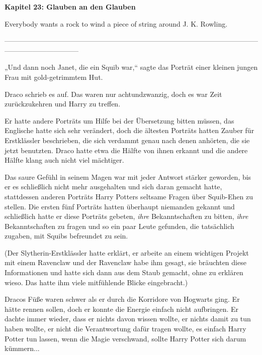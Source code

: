 

\hypertarget{glauben-an-den-glauben}{%

\textbf{Kapitel 23: Glauben an den Glauben\\ }

\hfill\break Everybody wants a rock to wind a piece of string around J. K. Rowling.

--------------------------------------------------------------------------------------------------------------------------------------------

\hfill\break „Und dann noch Janet, die ein Squib war,“ sagte das Porträt einer kleinen jungen Frau mit gold-getrimmtem Hut.

Draco schrieb es auf. Das waren nur achtundzwanzig, doch es war Zeit zurückzukehren und Harry zu treffen.

Er hatte andere Porträts um Hilfe bei der Übersetzung bitten müssen, das Englische hatte sich sehr verändert, doch die ältesten Porträts hatten Zauber für Erstklässler beschrieben, die sich verdammt genau nach denen anhörten, die sie jetzt benutzten. Draco hatte etwa die Hälfte von ihnen erkannt und die andere Hälfte klang auch nicht viel mächtiger.

Das saure Gefühl in seinem Magen war mit jeder Antwort stärker geworden, bis er es schließlich nicht mehr ausgehalten und sich daran gemacht hatte, stattdessen anderen Porträts Harry Potters seltsame Fragen über Squib-Ehen zu stellen. Die ersten fünf Porträts hatten überhaupt niemanden gekannt und schließlich hatte er diese Porträts gebeten, \emph{ihre} Bekanntschaften zu bitten, \emph{ihre} Bekanntschaften zu fragen und so ein paar Leute gefunden, die tatsächlich zugaben, mit Squibs befreundet zu sein.

(Der Slytherin-Erstklässler hatte erklärt, er arbeite an einem wichtigen Projekt mit einem Ravenclaw und der Ravenclaw habe ihm gesagt, sie bräuchten diese Informationen und hatte sich dann aus dem Staub gemacht, ohne zu erklären wieso. Das hatte ihm viele mitfühlende Blicke eingebracht.)

Dracos Füße waren schwer als er durch die Korridore von Hogwarts ging. Er hätte rennen sollen, doch er konnte die Energie einfach nicht aufbringen. Er dachte immer wieder, dass er nichts davon wissen wollte, er nichts damit zu tun haben wollte, er nicht die Verantwortung dafür tragen wollte, es einfach Harry Potter tun lassen, wenn die Magie verschwand, sollte Harry Potter sich darum kümmern...

}
